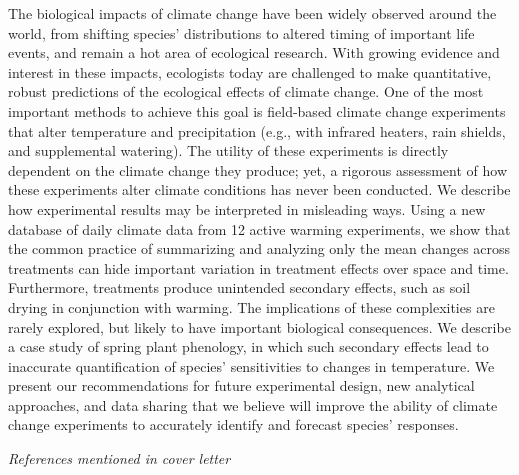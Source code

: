 \documentclass[11pt,a4paper]{letter}
\begin{document}
\begin{letter}{}
The biological impacts of climate change have been widely observed around the world, from shifting species' distributions to altered timing of important life events, and remain a hot area of ecological research. With growing evidence and interest in these impacts, ecologists today are challenged to make quantitative, robust predictions of the ecological effects of climate change. One of the most important methods to achieve this goal is field-based climate change experiments that alter temperature and precipitation (e.g., with infrared heaters, rain shields, and supplemental watering). The utility of these experiments is directly dependent on the climate change they produce; yet, a rigorous assessment of how these experiments alter climate conditions has never been conducted. We describe how experimental results may be interpreted in misleading ways. Using a new database of daily climate data from 12 active warming experiments, we show that the common practice of summarizing and analyzing only the mean changes across treatments can hide important variation in treatment effects over space and time. Furthermore, treatments produce unintended secondary effects, such as soil drying in conjunction with warming. The implications of these complexities are rarely explored, but likely to have important biological consequences. We describe a case study of spring plant phenology, in which such secondary effects lead to inaccurate quantification of species' sensitivities to changes in temperature. We present our recommendations for future experimental design, new analytical approaches, and data sharing that we believe will improve the ability of climate change experiments to accurately identify and forecast species' responses.


\newpage
\noindent \emph{References mentioned in cover letter}
\begin{footnotesize}
{\def\section*#1{}

}
\end{footnotesize}

\end{letter}
\end{document}
